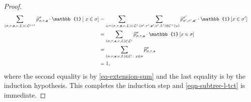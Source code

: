 \documentclass[11pt]{article}
\newcommand{\id}[1]{\mathbb{1}\left[#1\right]}
\newcommand{\seqS}{\boldsymbol{s}}
\begin{document}
\begin{proof}
    \begin{align*}
        \sum_{(\sigma,\tau, \seqS,v,L)\in \+L^{i+1}} \widehat{p}^{\sigma}_{\sigma,\tau,\seqS}\cdot \id{\ x\in \sigma}&=\sum_{u = (\sigma,\tau, \seqS,v,L)\in \+L^{i}}\sum_{(\sigma',\tau', \seqS',v',L')\in \+C^{+}(u)} \widehat{p}^{\sigma'}_{\sigma',\tau',\seqS'}\cdot \id{ x\in \sigma'}\\
        &=\sum_{(\sigma,\tau, \seqS,v,L)\in \+L^{i}}\widehat{p}^{\sigma}_{\sigma,\tau,\seqS}\cdot \id{x \in \sigma}\\
        &=\sum_{(\sigma,\tau, \seqS,v,L)\in \+L^i:\  x\in \sigma} \widehat{p}^{\sigma}_{\sigma,\tau,\seqS}\\
        &=1,
    \end{align*}
    where the second equality is by \eqref{eq-extension-sum} and the last equality is by the induction hypothesis.
    This completes the induction step and \eqref{eqn-subtree-l-tct} is immediate.


\end{proof}
\end{document}
